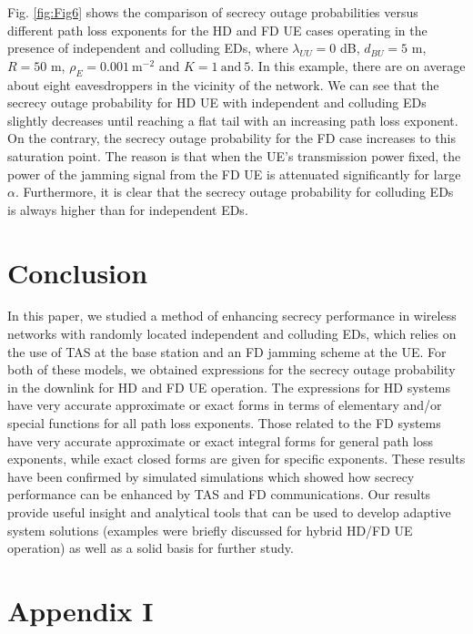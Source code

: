 \documentclass[10pt]{IEEEtran}
\begin{document}
Fig. \ref{fig:Fig6} shows the comparison of secrecy outage probabilities versus different path loss exponents for the HD and FD UE cases operating in the presence of independent and colluding EDs, where $\lambda_{UU} = 0$ dB, $d_{BU} = 5$ m, $R = 50$ m, $\rho_E = 0.001~\textrm{m}^{-2}$ and $K = 1~\textrm{and}~5$. In this example, there are on average about eight eavesdroppers in the vicinity of the network. We can see that the secrecy outage probability for HD UE with independent and colluding EDs slightly decreases until reaching a flat tail with an increasing path loss exponent. On the contrary, the secrecy outage probability for the FD case increases to this saturation point. The reason is that when the UE's transmission power fixed, the power of the jamming signal from the FD UE is attenuated significantly for large $\alpha$. Furthermore, it is clear that the secrecy outage probability for colluding EDs is always higher than for independent EDs.



\section{Conclusion}\label{sec:con}
In this paper, we studied a method of enhancing secrecy performance in wireless networks with randomly located independent and colluding EDs, which relies on the use of TAS at the base station and an FD jamming scheme at the UE. For both of these models, we obtained expressions for the secrecy outage probability in the downlink for HD and FD UE operation.  The expressions for HD systems have very accurate approximate or exact forms in terms of elementary and/or special functions for all path loss exponents.  Those related to the FD systems have very accurate approximate or exact integral forms for general path loss exponents, while exact closed forms are given for specific exponents.  These results have been confirmed by simulated simulations which showed how secrecy performance can be enhanced by TAS and FD communications. Our results provide useful insight and analytical tools that can be used to develop adaptive system solutions (examples were briefly discussed for hybrid HD/FD UE operation) as well as a solid basis for further study.


\section*{Appendix I}
\end{document}
